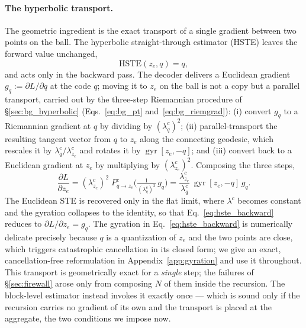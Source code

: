 \documentclass[12pt]{report}
\begin{document}
\paragraph{The hyperbolic transport.}
The geometric ingredient is the exact transport of a single gradient between two points on the ball. The hyperbolic straight-through estimator (HSTE) leaves the forward value unchanged,
\begin{equation}
    \label{eq:hste_forward}
    \mathrm{HSTE}(z_e,q) = q,
\end{equation}
and acts only in the backward pass. The decoder delivers a Euclidean gradient $g_q := \partial L/\partial q$ at the code $q$; moving it to $z_e$ on the ball is not a copy but a parallel transport, carried out by the three-step Riemannian procedure of \S\ref{sec:bg_hyperbolic} (Eqs.~\ref{eq:bg_pt} and~\ref{eq:bg_riemgrad}): (i) convert $g_q$ to a Riemannian gradient at $q$ by dividing by $(\lambda^c_q)^2$; (ii) parallel-transport the resulting tangent vector from $q$ to $z_e$ along the connecting geodesic, which rescales it by $\lambda^c_q/\lambda^c_{z_e}$ and rotates it by $\operatorname{gyr}[z_e,-q]$; and (iii) convert back to a Euclidean gradient at $z_e$ by multiplying by $(\lambda^c_{z_e})^2$. Composing the three steps,
\begin{equation}
    \label{eq:hste_backward}
    \frac{\partial L}{\partial z_e}
    = (\lambda^c_{z_e})^2\; P^c_{q\to z_e}\!\Big(\tfrac{1}{(\lambda^c_q)^2}\,g_q\Big)
    = \frac{\lambda^c_{z_e}}{\lambda^c_q}\,\operatorname{gyr}[z_e,-q]\,g_q .
\end{equation}
The Euclidean STE is recovered only in the flat limit, where $\lambda^c$ becomes constant and the gyration collapses to the identity, so that Eq.~\ref{eq:hste_backward} reduces to $\partial L/\partial z_e = g_q$. The gyration in Eq.~\ref{eq:hste_backward} is numerically delicate precisely because $q$ is a quantization of $z_e$ and the two points are close, which triggers catastrophic cancellation in its closed form; we give an exact, cancellation-free reformulation in Appendix~\ref{app:gyration} and use it throughout. This transport is geometrically exact for a \emph{single} step; the failures of \S\ref{sec:firewall} arose only from composing $N$ of them inside the recursion. The block-level estimator instead invokes it exactly once --- which is sound only if the recursion carries no gradient of its own and the transport is placed at the aggregate, the two conditions we impose now.
\end{document}

